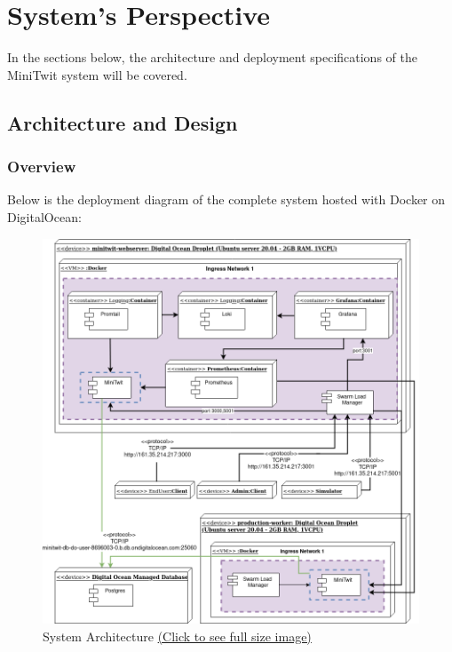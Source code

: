 \section{System's Perspective}
In the sections below, the architecture and deployment specifications of the MiniTwit system will be covered.

\subsection{Architecture and Design}

\subsubsection{Overview}
Below is the deployment diagram of the complete system hosted with Docker on DigitalOcean:

\begin{figure}[h!]
    \centering
    \includegraphics[width=1\linewidth]{report/images/system-architecture.png}
    \caption{System Architecture \href{https://github.com/Niels-Frederik/MiniTwit/blob/main/report/images/system-architecture.png}{(Click to see full size image)}}
    \label{fig:arcitechture-overview}
\end{figure}

